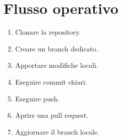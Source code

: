 \section{Flusso operativo}

\begin{enumerate}
  \item Clonare la repository.
  \item Creare un branch dedicato.
  \item Apportare modifiche locali.
  \item Eseguire commit chiari.
  \item Eseguire push.
  \item Aprire una pull request.
  \item Aggiornare il branch locale.
\end{enumerate}